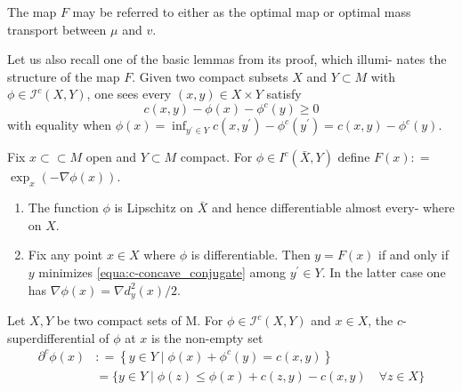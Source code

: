 The map \( F \) may be referred to either as the optimal map or optimal mass
transport between \( \mu \) and \( v \).

Let us also recall one of the basic lemmas from its proof, which illumi-
nates the structure of the map \( F \). Given two compact subsets \( X \) and \( Y \subset M \)
with \( \phi \in \mathcal { I } ^ { c } ( X , Y ) \), one sees every \( ( x , y ) \in X \times Y \) satisfy
\begin{equation}
	\label{equa:c-concave_conjugate}
	c ( x , y ) - \phi ( x ) - \phi ^ { c } ( y ) \geq 0
\end{equation}
with equality when \( \phi ( x ) = \inf _ { y ^ { \prime } \in Y } c \left( x , y ^ { \prime } \right) - \phi ^ { c } \left( y ^ { \prime } \right) = c ( x , y ) - \phi ^ { c } ( y ) . \)

\begin{lem}
	\label{lem:minimizer_differentiable}
	Fix \( x \subset \subset M \) open and \( Y \subset M \) compact. For \( \phi \in I ^ { c } ( \bar { X } , Y ) \) define \( F ( x ) : = \)
	\( \exp _ { x } ( - \nabla \phi ( x ) ) \).
	\begin{enumerate}
		\item The function \( \phi \) is Lipschitz on \( \bar { X } \) and hence differentiable almost every-
		      where on \( X \).
		\item Fix any point \( x \in X \) where \( \phi \) is differentiable. Then \( y = F ( x ) \) if and
		      only if \( y \) minimizes \cref{equa:c-concave_conjugate} among \( y ^ { \prime } \in Y . \) In the latter case one has
		      \( \nabla \phi ( x ) = \nabla d _ { y } ^ { 2 } ( x ) / 2 \).
	\end{enumerate}
\end{lem}

\begin{defn}
	Let \( X , Y \) be two compact sets of M. For \( \phi \in \mathcal { I } ^ { c } ( X , Y ) \)
	and \( x \in X \), the \( c \)-superdifferential of \( \phi \) at \( x \) is the non-empty set
	\begin{align}
		\partial ^ { c } \phi ( x ) & : = \left\{ y \in Y \mid \phi ( x ) + \phi ^ { c } ( y ) = c ( x , y ) \right\}                   \\
		                            & = \{ y \in Y \mid \phi ( z ) \leq \phi ( x ) + c ( z , y ) - c ( x , y ) \quad \forall z \in X \}
		\label{equa:c-superdifferential}
	\end{align}
\end{defn}

